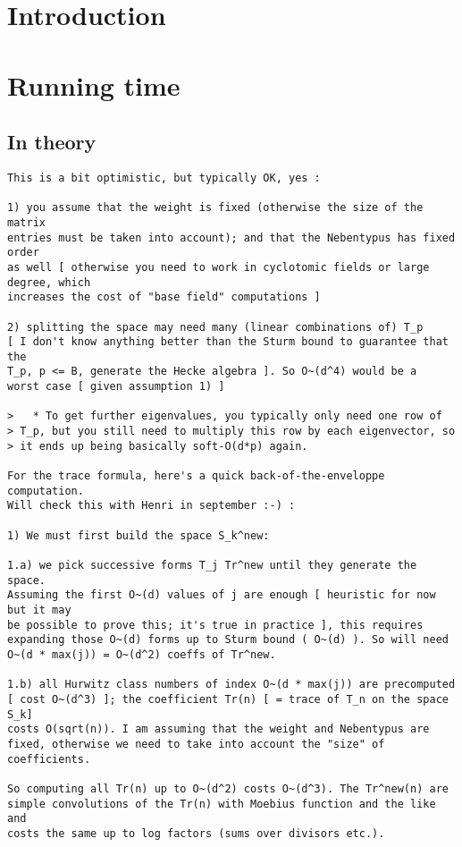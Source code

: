 \documentclass[11pt]{amsart}
\numberwithin{equation}{subsection}
\theoremstyle{definition}
\begin{document}
\section{Introduction}

\section{Running time}

\subsection{In theory}

\begin{verbatim}
This is a bit optimistic, but typically OK, yes :

1) you assume that the weight is fixed (otherwise the size of the matrix
entries must be taken into account); and that the Nebentypus has fixed order
as well [ otherwise you need to work in cyclotomic fields or large degree, which
increases the cost of "base field" computations ]

2) splitting the space may need many (linear combinations of) T_p 
[ I don't know anything better than the Sturm bound to guarantee that the
T_p, p <= B, generate the Hecke algebra ]. So O~(d^4) would be a
worst case [ given assumption 1) ]

>   * To get further eigenvalues, you typically only need one row of
> T_p, but you still need to multiply this row by each eigenvector, so
> it ends up being basically soft-O(d*p) again.

For the trace formula, here's a quick back-of-the-enveloppe computation.
Will check this with Henri in september :-) :

1) We must first build the space S_k^new: 

1.a) we pick successive forms T_j Tr^new until they generate the space.
Assuming the first O~(d) values of j are enough [ heuristic for now but it may
be possible to prove this; it's true in practice ], this requires
expanding those O~(d) forms up to Sturm bound ( O~(d) ). So will need
O~(d * max(j)) = O~(d^2) coeffs of Tr^new.

1.b) all Hurwitz class numbers of index O~(d * max(j)) are precomputed
[ cost O~(d^3) ]; the coefficient Tr(n) [ = trace of T_n on the space S_k]
costs O(sqrt(n)). I am assuming that the weight and Nebentypus are
fixed, otherwise we need to take into account the "size" of coefficients.

So computing all Tr(n) up to O~(d^2) costs O~(d^3). The Tr^new(n) are
simple convolutions of the Tr(n) with Moebius function and the like and
costs the same up to log factors (sums over divisors etc.).


\end{verbatim}
\end{document}
